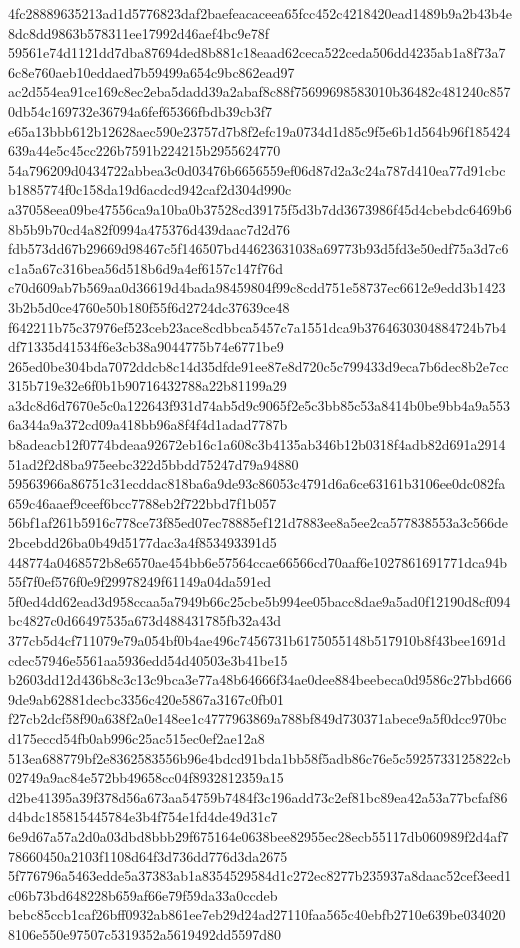 \documentclass[11pt,a4paper]{article}
\begin{document}
{4fc28889635213ad1d5776823daf2baefeacaceea65fcc452c4218420ead1489b9a2b43b4e8dc8dd9863b578311ee17992d46aef4bc9e78f
59561e74d1121dd7dba87694ded8b881c18eaad62ceca522ceda506dd4235ab1a8f73a76c8e760aeb10eddaed7b59499a654c9bc862ead97
ac2d554ea91ce169c8ec2eba5dadd39a2abaf8c88f75699698583010b36482c481240c8570db54c169732e36794a6fef65366fbdb39cb3f7
e65a13bbb612b12628aec590e23757d7b8f2efc19a0734d1d85c9f5e6b1d564b96f185424639a44e5c45cc226b7591b224215b2955624770
54a796209d0434722abbea3c0d03476b6656559ef06d87d2a3c24a787d410ea77d91cbcb1885774f0c158da19d6acdcd942caf2d304d990c
a37058eea09be47556ca9a10ba0b37528cd39175f5d3b7dd3673986f45d4cbebdc6469b68b5b9b70cd4a82f0994a475376d439daac7d2d76
fdb573dd67b29669d98467c5f146507bd44623631038a69773b93d5fd3e50edf75a3d7c6c1a5a67c316bea56d518b6d9a4ef6157c147f76d
c70d609ab7b569aa0d36619d4bada98459804f99c8cdd751e58737ec6612e9edd3b14233b2b5d0ce4760e50b180f55f6d2724dc37639ce48
f642211b75c37976ef523ceb23ace8cdbbca5457c7a1551dca9b3764630304884724b7b4df71335d41534f6e3cb38a9044775b74e6771be9
265ed0be304bda7072ddcb8c14d35dfde91ee87e8d720c5c799433d9eca7b6dec8b2e7cc315b719e32e6f0b1b90716432788a22b81199a29
a3dc8d6d7670e5c0a122643f931d74ab5d9c9065f2e5c3bb85c53a8414b0be9bb4a9a5536a344a9a372cd09a418bb96a8f4f4d1adad7787b
b8adeacb12f0774bdeaa92672eb16c1a608c3b4135ab346b12b0318f4adb82d691a291451ad2f2d8ba975eebc322d5bbdd75247d79a94880
59563966a86751c31ecddac818ba6a9de93c86053c4791d6a6ce63161b3106ee0dc082fa659c46aaef9ceef6bcc7788eb2f722bbd7f1b057
56bf1af261b5916c778ce73f85ed07ec78885ef121d7883ee8a5ee2ca577838553a3c566de2bcebdd26ba0b49d5177dac3a4f853493391d5
448774a0468572b8e6570ae454bb6e57564ccae66566cd70aaf6e1027861691771dca94b55f7f0ef576f0e9f29978249f61149a04da591ed
5f0ed4dd62ead3d958ccaa5a7949b66c25cbe5b994ee05bacc8dae9a5ad0f12190d8cf094bc4827c0d66497535a673d488431785fb32a43d
377cb5d4cf711079e79a054bf0b4ae496c7456731b6175055148b517910b8f43bee1691dcdec57946e5561aa5936edd54d40503e3b41be15
b2603dd12d436b8c3c13c9bca3e77a48b64666f34ae0dee884beebeca0d9586c27bbd6669de9ab62881decbc3356c420e5867a3167c0fb01
f27cb2dcf58f90a638f2a0e148ee1c4777963869a788bf849d730371abece9a5f0dcc970bcd175eccd54fb0ab996c25ac515ec0ef2ae12a8
513ea688779bf2e8362583556b96e4bdcd91bda1bb58f5adb86c76e5c5925733125822cb02749a9ac84e572bb49658cc04f8932812359a15
d2be41395a39f378d56a673aa54759b7484f3c196add73c2ef81bc89ea42a53a77bcfaf86d4bdc185815445784e3b4f754e1fd4de49d31c7
6e9d67a57a2d0a03dbd8bbb29f675164e0638bee82955ec28ecb55117db060989f2d4af778660450a2103f1108d64f3d736dd776d3da2675
5f776796a5463edde5a37383ab1a8354529584d1c272ec8277b235937a8daac52cef3eed1c06b73bd648228b659af66e79f59da33a0ccdeb
bebc85ccb1caf26bff0932ab861ee7eb29d24ad27110faa565c40ebfb2710e639be0340208106e550e97507c5319352a5619492dd5597d80
}
\end{document}
